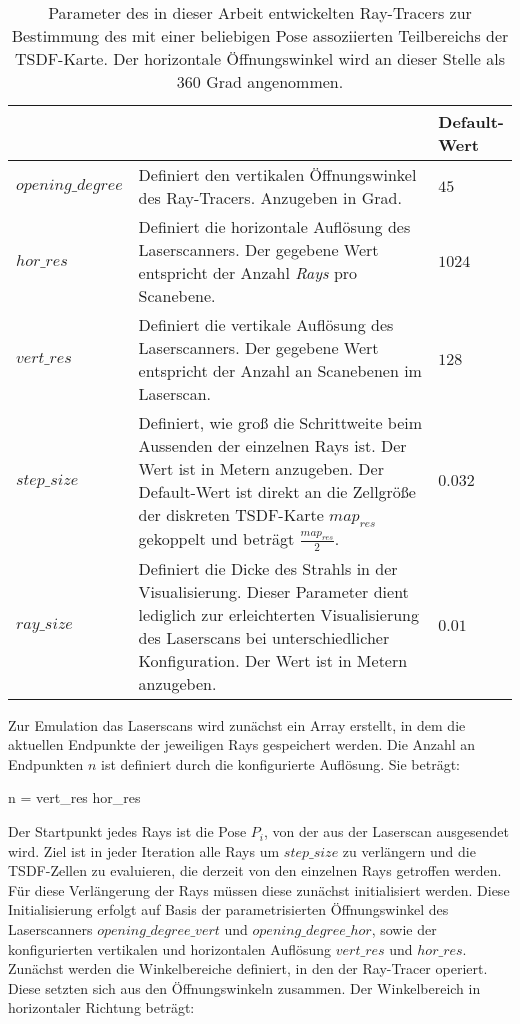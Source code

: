 	\begin{table}
		\centering
		\caption{Parameter des in dieser Arbeit entwickelten Ray-Tracers zur Bestimmung des mit einer beliebigen Pose assoziierten Teilbereichs der TSDF-Karte. Der horizontale Öffnungswinkel wird an dieser Stelle als $360$ Grad angenommen.}
		\begin{tabular}{| p{3cm} | p{8cm} | p{2cm} |}
			\hline
			\thead{Parameter}   & \thead{Funktionsweise}  & \thead{Default-\\Wert}\\
			\hline
			$opening\_degree$   & Definiert den vertikalen Öffnungswinkel des Ray-Tracers. Anzugeben in Grad. & $45$ \\
			\hline
			$hor\_res$     & Definiert die horizontale Auflösung des Laserscanners. Der gegebene Wert  entspricht der Anzahl \textit{Rays} pro Scanebene. & $1024$\\
			\hline			
			$vert\_res$    & Definiert die vertikale Auflösung des Laserscanners. Der gegebene Wert entspricht der Anzahl an Scanebenen im Laserscan. & $128$\\
			\hline			
			$step\_size$      & Definiert, wie groß die Schrittweite beim Aussenden der einzelnen Rays ist. Der Wert ist in Metern anzugeben. Der Default-Wert ist direkt an die Zellgröße der diskreten TSDF-Karte $map_{res}$ gekoppelt und beträgt $\frac{map_{res}}{2}$. & $0.032$ \\
			\hline			
			$ray\_size$   & Definiert die Dicke des Strahls in der Visualisierung. Dieser Parameter dient lediglich zur erleichterten Visualisierung des Laserscans bei unterschiedlicher Konfiguration. Der Wert ist in Metern anzugeben. & $0.01$ \\
			\hline
		\end{tabular}
		\label{table:raytracer_params}
	\end{table}	
	
Zur Emulation das Laserscans wird zunächst ein Array erstellt, in dem die aktuellen Endpunkte der jeweiligen Rays gespeichert werden. Die Anzahl an Endpunkten $n$ ist definiert durch die konfigurierte Auflösung. Sie beträgt:

\begin{myequation}
n = vert\_res \cdot hor\_res
\end{myequation}

 Der Startpunkt jedes Rays ist die Pose $P_i$, von der aus der Laserscan ausgesendet wird. Ziel ist in jeder Iteration alle Rays um $step\_size$ zu verlängern und die TSDF-Zellen zu evaluieren, die derzeit von den einzelnen Rays getroffen werden. Für diese Verlängerung der Rays müssen diese zunächst initialisiert werden. Diese Initialisierung erfolgt auf Basis der parametrisierten Öffnungswinkel des Laserscanners $opening\_degree\_vert$ und $opening\_degree\_hor$, sowie der konfigurierten vertikalen und horizontalen Auflösung $vert\_res$ und $hor\_res$.
Zunächst werden die Winkelbereiche definiert, in den der Ray-Tracer operiert. Diese setzten sich aus den Öffnungswinkeln zusammen. Der Winkelbereich in horizontaler Richtung beträgt:

